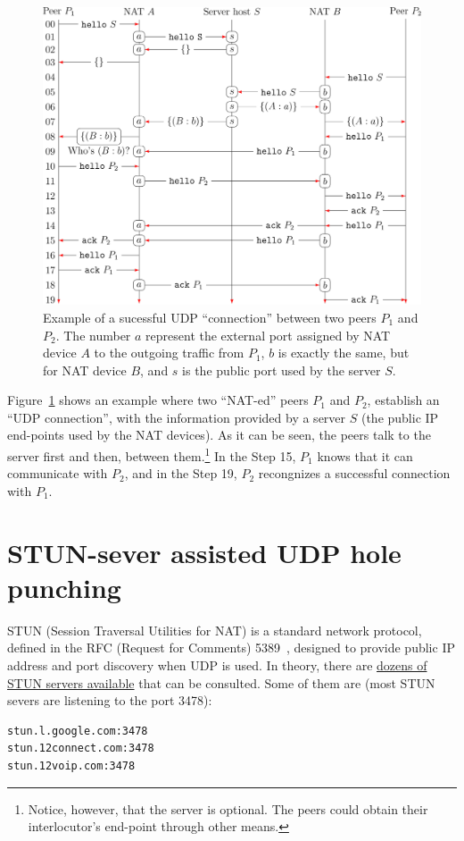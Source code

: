 \begin{figure}
  \includegraphics{graphics/UDP_Hole_Punching_RCN}
  \caption{Example of a sucessful UDP ``connection'' between two peers
    $P_1$ and $P_2$. The number $a$ represent the external port
    assigned by NAT device $A$ to the outgoing traffic from $P_1$,
    $b$ is exactly the same, but for NAT device $B$, and $s$ is the
    public port used by the server $S$.}
  \label{fig:UHP}
\end{figure}

Figure~\ref{fig:UHP} shows an example where two ``NAT-ed'' peers $P_1$
and $P_2$, establish an ``UDP connection'', with the information
provided by a server $S$ (the public IP end-points used by the NAT
devices). As it can be seen, the peers talk to the server first and
then, between them.\footnote{Notice, however, that the server is
  optional. The peers could obtain their interlocutor's end-point
  through other means.} In the Step 15, $P_1$ knows that it can
communicate with $P_2$, and in the Step 19, $P_2$ recongnizes a
successful connection with $P_1$.

\section{STUN-sever assisted UDP hole punching}

STUN (Session Traversal Utilities for NAT) is a standard network
protocol, defined in the RFC (Request for Comments) 5389~\cite{STUN},
designed to provide public IP address and port discovery when UDP is
used. In theory, there are
\href{https://gist.github.com/mondain/b0ec1cf5f60ae726202e}{dozens of
  STUN servers available} that can be consulted. Some of them are
(most STUN severs are listening to the port 3478):
\begin{verbatim}
stun.l.google.com:3478
stun.12connect.com:3478
stun.12voip.com:3478
\end{verbatim}

